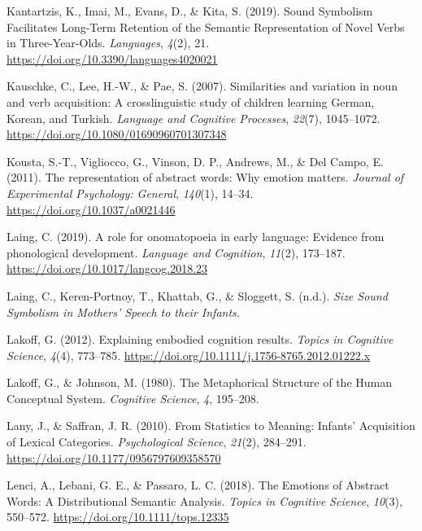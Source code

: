 \documentclass[
  man,floatsintext]{apa6}
\newlength{\cslhangindent}
\newenvironment{CSLReferences}[2] %
 {\begin{list}{}{%
  \setlength{\itemindent}{0pt}
  \setlength{\leftmargin}{0pt}
  \setlength{\parsep}{0pt}
  \ifodd #1
   \setlength{\leftmargin}{\cslhangindent}
   \setlength{\itemindent}{-1\cslhangindent}
  \fi
  \setlength{\itemsep}{#2\baselineskip}}}
 {\end{list}}
\begin{document}
\begin{CSLReferences}{1}{0}
Kantartzis, K., Imai, M., Evans, D., \& Kita, S. (2019). Sound {Symbolism Facilitates Long-Term Retention} of the {Semantic Representation} of {Novel Verbs} in {Three-Year-Olds}. \emph{Languages}, \emph{4}(2), 21. \url{https://doi.org/10.3390/languages4020021}

Kauschke, C., Lee, H.-W., \& Pae, S. (2007). Similarities and variation in noun and verb acquisition: {A} crosslinguistic study of children learning {German}, {Korean}, and {Turkish}. \emph{Language and Cognitive Processes}, \emph{22}(7), 1045--1072. \url{https://doi.org/10.1080/01690960701307348}

Kousta, S.-T., Vigliocco, G., Vinson, D. P., Andrews, M., \& Del Campo, E. (2011). The representation of abstract words: {Why} emotion matters. \emph{Journal of Experimental Psychology: General}, \emph{140}(1), 14--34. \url{https://doi.org/10.1037/a0021446}

Laing, C. (2019). A role for onomatopoeia in early language: Evidence from phonological development. \emph{Language and Cognition}, \emph{11}(2), 173--187. \url{https://doi.org/10.1017/langcog.2018.23}

Laing, C., Keren-Portnoy, T., Khattab, G., \& Sloggett, S. (n.d.). \emph{Size {Sound Symbolism} in {Mothers}' {Speech} to their {Infants}.}

Lakoff, G. (2012). Explaining embodied cognition results. \emph{Topics in Cognitive Science}, \emph{4}(4), 773--785. \url{https://doi.org/10.1111/j.1756-8765.2012.01222.x}

Lakoff, G., \& Johnson, M. (1980). The {Metaphorical Structure} of the {Human Conceptual System}. \emph{Cognitive Science}, \emph{4}, 195--208.

Lany, J., \& Saffran, J. R. (2010). From {Statistics} to {Meaning}: {Infants}' {Acquisition} of {Lexical Categories}. \emph{Psychological Science}, \emph{21}(2), 284--291. \url{https://doi.org/10.1177/0956797609358570}

Lenci, A., Lebani, G. E., \& Passaro, L. C. (2018). The {Emotions} of {Abstract Words}: {A Distributional Semantic Analysis}. \emph{Topics in Cognitive Science}, \emph{10}(3), 550--572. \url{https://doi.org/10.1111/tops.12335}


\end{CSLReferences}
\end{document}

